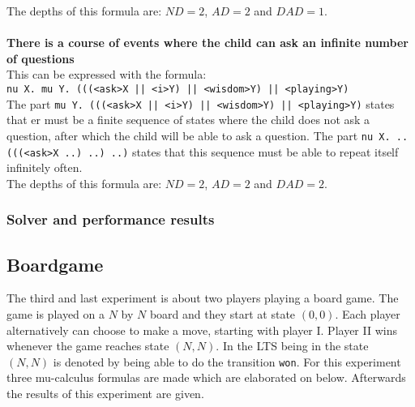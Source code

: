 \documentclass[10pt,a4paper]{article}
\begin{document}
The depths of this formula are: $ND = 2$, $AD = 2$ and $DAD = 1$.
\\\\
\textbf{There is a course of events where the child can ask an infinite number of questions}\\
This can be expressed with the formula:\\
{\tt nu X. mu Y. (((<ask>X || <i>Y) || <wisdom>Y) || <playing>Y)}\\
The part {\tt mu Y. (((<ask>X || <i>Y) || <wisdom>Y) || <playing>Y)} states that er must be a finite sequence of states where the child does not ask a question, after which the child will be able to ask a question. The part {\tt nu X. .. (((<ask>X ..) ..) ..)} states that this sequence must be able to repeat itself infinitely often.\\
The depths of this formula are: $ND = 2$, $AD = 2$ and $DAD = 2$.

\subsubsection{Solver and performance results}


\subsection{Boardgame}
The third and last experiment is about two players playing a board game. The game is played on a $N$ by $N$ board and they start at state $(0, 0)$. Each player alternatively can choose to make a move, starting with player I. Player II wins whenever the game reaches state $(N, N)$. In the LTS being in the state $(N, N)$ is denoted by being able to do the transition {\tt won}. For this experiment three mu-calculus formulas are made which are elaborated on below. Afterwards the results of this experiment are given.
\end{document}
